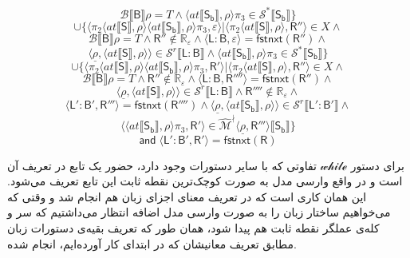 $$\mathcal{B}\llbracket \mathsf{B} \rrbracket \rho = \mathit{T}\land \langle at \llbracket \mathsf{S_b} \rrbracket , \rho \rangle \pi_3 \in \mathcal{S}^* \llbracket \mathsf{S_b} \rrbracket \}$$
$$\cup\{\langle \pi_2 \langle at \llbracket \mathsf{S} \rrbracket , \rho \rangle \langle at \llbracket \mathsf{S_b} \rrbracket , \rho \rangle \pi_3 , \varepsilon \rangle | \langle \pi_2 \langle at \llbracket \mathsf{S} \rrbracket , \rho \rangle , \mathsf{R''} \rangle \in X \land$$
$$\mathcal{B} \llbracket \mathsf{B} \rrbracket \rho = \mathit{T} \land \mathsf{R''} \notin \mathbb{R_\varepsilon} \land \langle \mathsf{L:B} , \varepsilon \rangle = \mathsf{fstnxt(R'')} \land$$	
$$\langle \underline{\rho} ,\langle at \llbracket \mathsf{S} \rrbracket, \rho \rangle \rangle \in \mathcal{S}^r \llbracket \mathsf{L:B} \rrbracket \land \langle at \llbracket \mathsf{S_b} \rrbracket , \rho \rangle \pi_3 \in \mathcal{S}^* \llbracket \mathsf{S_b} \rrbracket\}$$ 
$$\cup \{ \langle \pi_2 \langle at \llbracket \mathsf{S} \rrbracket , \rho \rangle \langle at \llbracket \mathsf{S_b} \rrbracket , \rho \rangle \pi_3 , \mathsf{R'} \rangle | \langle \pi_2 \langle at \llbracket \mathsf{S} \rrbracket , \rho \rangle , \mathsf{R''} \rangle \in X \land$$
$$\mathcal{B} \llbracket \mathsf{B} \rrbracket \rho = \mathit{T} \land \mathsf{R''} \notin \mathbb{R_\varepsilon} \land \langle \mathsf{L:B,R''''} \rangle = \mathsf{fstnxt(R'')} \land$$
$$\langle \underline{\rho} , \langle at \llbracket \mathsf{S}\rrbracket , \rho \rangle \rangle \in \mathcal{S}^r \llbracket \mathsf{L:B} \rrbracket \land \mathsf{R''''} \notin \mathbb{R_\varepsilon} \land$$
$$\langle \mathsf{L':B',R'''} \rangle = \mathsf{fstnxt(R'''')} \land \langle \underline{\rho} , \langle at \llbracket \mathsf{S_b}\rrbracket , \rho \rangle \rangle \in \mathcal{S}^r \llbracket \mathsf{L':B'} \rrbracket \land$$
$$\langle \langle at \llbracket \mathsf{S_b} \rrbracket, \rho \rangle \pi_3 , \mathsf{R'} \rangle \in \mathcal{\hat{M}^\nmid} \langle \underline{\rho} , \mathsf{R'''} \rangle \llbracket \mathsf{S_b} \rrbracket \}$$
$$ \mathsf{and \; \langle L':B' , R' \rangle = fstnxt(R)}$$

برای دستور $\mathscr{while}$ تفاوتی که با سایر دستورات وجود دارد، حضور یک تابع در تعریف آن است و در واقع وارسی مدل به صورت کوچک‌ترین نقطه ثابت این تابع تعریف می‌شود. این همان کاری است که در تعریف معنای اجزای زبان هم انجام شد و وقتی که می‌خواهیم ساختار زبان را به صورت وارسی مدل اضافه انتظار می‌داشتیم که سر و کله‌ی عملگر نقطه ثابت هم پیدا شود، همان طور که تعریف بقیه‌ی دستورات زبان مطابق تعریف معانیشان که در ابتدای کار آورده‌ایم، انجام شده.


